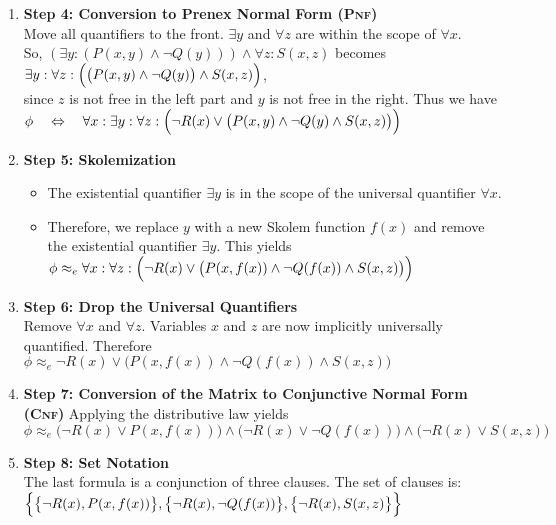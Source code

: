 \begin{enumerate}
\item \textbf{Step 4: Conversion to Prenex Normal Form (\textsc{Pnf})} \\
      Move all quantifiers to the front. $\exists y$ and $\forall z$ are within the scope of $\forall x$. \\
      So, $(\exists y: (P(x,y) \land \neg Q(y))) \land \forall z: S(x,z)$ becomes
      \\[0.2cm]
      \hspace*{1.3cm}
   $\exists y: \forall z: \Bigl(\bigl(P(x,y) \land \neg Q(y)\bigr) \land S(x,z)\Bigr)$,
      \\[0.2cm]
      since $z$ is not free in the left part and $y$ is not free in the right. 
      Thus we have 
      \\[0.2cm]
      \hspace*{1.3cm}
      $\phi \quad\Leftrightarrow\quad
       \forall x: \exists y: \forall z: \Bigl(\neg R(x) \lor \bigl(P(x,y) \land \neg Q(y) \land S(x,z)\bigr)\Bigr)$
    \item \textbf{Step 5: Skolemization}
    \begin{itemize}
        \item The existential quantifier $\exists y$ is in the scope of the universal quantifier $\forall x$.
        \item Therefore, we replace $y$ with a new Skolem function $f(x)$ and remove the existential quantifier
          $\exists y$.   This yields
          \\[0.2cm]
          \hspace*{1.3cm}
          $\phi \approx_e \forall x: \forall z: \Bigl(\neg R(x) \lor \bigl(P(x,f(x)) \land \neg Q(f(x)) \land S(x,z)\bigr)\Bigr)$
       \end{itemize}
  \item \textbf{Step 6: Drop the Universal Quantifiers} \\
    Remove $\forall x$ and $\forall z$. Variables $x$ and $z$ are now implicitly universally quantified.  Therefore
    \\[0.2cm]
    \hspace*{1.3cm}
    $\phi \approx_e \neg R(x) \lor \bigl(P(x,f(x)) \land \neg Q(f(x)) \land S(x,z)\bigr)$ 

    \item \textbf{Step 7: Conversion of the Matrix to Conjunctive Normal Form (\textsc{Cnf})} 
          Applying the distributive law yields 
          \\[0.2cm]
          \hspace*{1.3cm}
    $\phi \approx_e \bigl(\neg R(x) \lor P(x,f(x))\bigr) \land \bigl(\neg R(x) \lor \neg Q(f(x))\bigr) \land \bigl(\neg R(x) \lor S(x,z)\bigr)$

    \item \textbf{Step 8: Set Notation} \\
    The last formula  is a conjunction of three clauses. The set of clauses is: 
    \\[0.2cm]
    \hspace*{1.3cm}
    $\Bigl\{\bigl\{\neg R(x), P(x,f(x))\bigr\}, \bigl\{\neg R(x), \neg Q(f(x))\bigr\}, \bigl\{\neg R(x), S(x,z)\bigl\} \Bigl\}$
\end{enumerate}

